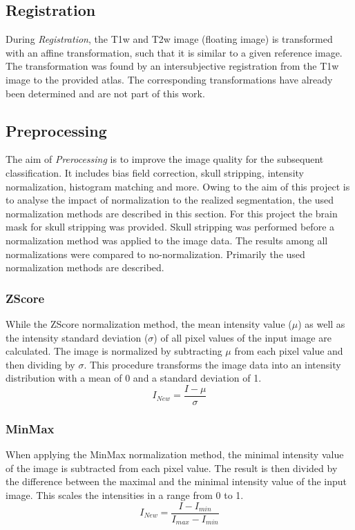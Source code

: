 \documentclass[article]{IEEEtran}
\begin{document}
\subsection{Registration}
	During {\itshape Registration}, the T1w and T2w image (floating image) is transformed with an affine transformation, such that it is similar to a given reference image.
	The transformation was found by an intersubjective registration from the T1w image to the provided atlas. The corresponding transformations have already been determined
	and are not part of this work. 	
	
\subsection{Preprocessing}
	The aim of {\itshape Prerocessing} is to improve the image quality for the subsequent classification. It includes bias field correction, skull stripping, intensity normalization, histogram matching and more.
	Owing to the aim of this project is to analyse the impact of normalization to the realized segmentation, the used normalization methods are described in this section.
	For this project the brain mask for skull stripping was provided. Skull stripping was performed before a normalization method was applied to the image data. The results among all normalizations were compared to no-normalization. Primarily the used normalization methods are described.\cite{reinhold2018} \smallskip
		
	\subsubsection{ZScore}
	While the ZScore normalization method, the mean intensity value ($\mu$) as well as the intensity standard deviation ($\sigma$) of all pixel values of the input image are calculated. 
	The image is normalized by subtracting $\mu$ from each pixel value and then dividing by $\sigma$.
	This procedure transforms the image data into an intensity distribution with a mean of 0 and a standard deviation of 1.
		\begin{equation}\label{ZScore}
			I_{New} = \frac{I - \mu}{\sigma}
		\end{equation}
			
	\subsubsection{MinMax}
	When applying the MinMax normalization method, the minimal intensity value of the image is subtracted from each pixel value.
	The result is then divided by the difference between the maximal and the minimal intensity value of the input image.
	This scales the intensities in a range from 0 to 1. 
		\begin{equation}
			I_{New} = \frac{I - I_{min}}{I_{max} - I_{min}}
		\end{equation}
		
\end{document}

